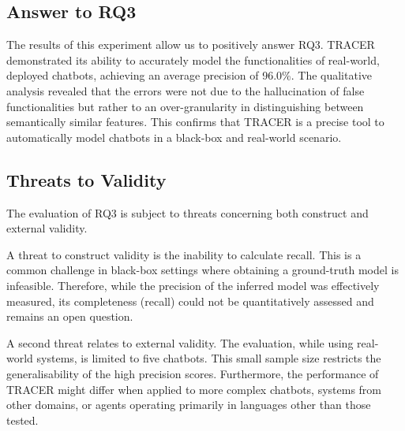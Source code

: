 \subsection{Answer to RQ3}

The results of this experiment allow us to positively answer RQ3.
\ac{TRACER} demonstrated its ability
to accurately model the functionalities of
real-world, deployed chatbots, achieving an average precision of 96.0\%.
The qualitative analysis revealed that
the errors were not due to the hallucination of false functionalities
but rather to an over-granularity in distinguishing
between semantically similar features.
This confirms that \ac{TRACER} is a precise tool
to automatically model chatbots
in a black-box and real-world scenario.

\subsection{Threats to Validity}
The evaluation of RQ3
is subject to threats concerning
both construct and external validity.

A threat to construct validity
is the inability to calculate recall.
This is a common challenge in black-box settings
where obtaining a ground-truth model is infeasible.
Therefore, while the precision of the inferred model
was effectively measured,
its completeness (recall) could not be
quantitatively assessed and remains an open question.

A second threat relates to external validity.
The evaluation, while using real-world systems,
is limited to five chatbots.
This small sample size
restricts the generalisability of the high precision scores.
Furthermore, the performance of TRACER
might differ when applied to more complex chatbots,
systems from other domains,
or agents operating primarily in languages other than those tested.

